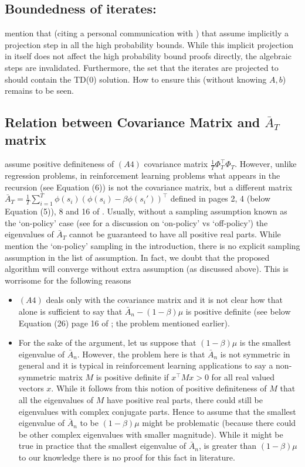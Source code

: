 \documentclass{article}
\begin{document}
\subsection{Boundedness of iterates:  \citet{lstdicmla}}
\citet{gugan} mention that (citing a personal communication with \citet{lstdicmla}) 
that \cite{lstdicmla} assume implicitly a projection step in all the high probability bounds. 
While this implicit projection in itself does not affect the high probability bound proofs directly, 
the algebraic steps are invalidated.
Furthermore, the set that the iterates are projected to should contain the TD(0) solution.
How to ensure this (without knowing $A,b$) remains to be seen.

\subsection{Relation between Covariance Matrix and $\bar{A}_T$ matrix}
\citet{flstda} assume positive definiteness of \textbf{$(A4)$} covariance matrix $\frac{1}{T}\Phi^\top_T \Phi_T$. However, unlike regression problems, in reinforcement learning problems what appears in the recursion (see Equation (6)) is not the covariance matrix, but a different matrix $\bar{A}_T=\frac{1}{T}\sum_{i=1}^T \phi(s_i)(\phi(s_i)-\beta\phi(s_i'))^\top$ defined in pages 2, 4 (below Equation (5)), 8 and 16 of \cite{flstda}. Usually, without a sampling assumption known as the `on-policy' case (see \cite{gtd} for a discussion on `on-policy' vs `off-policy') the eigenvalues of $\bar{A}_T$ cannot be guaranteed to have all positive real parts. While \citet{flstda} mention the `on-policy' sampling in the introduction, there is no explicit sampling assumption in the list of assumption. In fact, we doubt that the proposed algorithm will converge without extra assumption (as discussed above).
This is worrisome for the following reasons
\begin{itemize}
\item \textbf{$(A4)$} deals only with the covariance matrix and it is not clear how that alone is sufficient to say that $\bar{A}_n-(1-\beta)\mu$ is positive definite (see below Equation (26) page 16 of \cite{flstda}; the problem mentioned earlier).
\item For the sake of the argument, let us suppose that $(1-\beta)\mu$ is the smallest eigenvalue of $\bar{A}_n$. However, the problem here is that $\bar{A}_n$ is not symmetric in general and it is typical in reinforcement learning applications to say a non-symmetric matrix $M$ is positive definite if $x^\top M x>0$ for all real valued vectors $x$. While it follows from this notion of positive definiteness of $M$ that all the eigenvalues of $M$ have positive real parts, there could still be eigenvalues with complex conjugate parts. Hence to assume that the smallest eigenvalue of $\bar{A}_n$ to be $(1-\beta)\mu$ might be problematic (because there could be other complex eigenvalues with smaller magnitude). While it might be true in practice that the smallest eigenvalue of $\bar{A}_n$, is greater than $(1-\beta)\mu$ to our knowledge there is no proof for this fact in literature.
\end{itemize}
\fi
\end{document}
